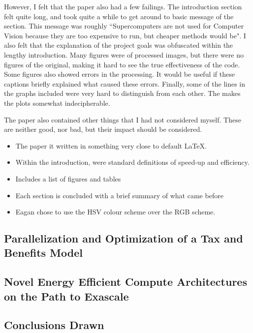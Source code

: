 \documentclass[../main.tex]{subfiles}
\begin{document}
    However, I felt that the paper also had a few failings.
    The introduction section felt quite long, and took quite a while to get around to basic message of the section.
    This message was roughly ``Supercomputers are not used for Computer Vision because they are too expensive to run, but cheaper methods would be".
    I also felt that the explanation of the project goals was obfuscated within the lengthy introduction.
    Many figures were of processed images, but there were no figures of the original, making it hard to see the true effectiveness of the code.
    Some figures also showed errors in the processing.
    It would be useful if these captions briefly explained what caused these errors.
    Finally, some of the lines in the graphs included were very hard to distinguish from each other.
    The makes the plots somewhat indecipherable.  

    The paper also contained other things that I had not considered myself.
    These are neither good, nor bad, but their impact should be considered.
    \begin{itemize}
      \item The paper it written in something very close to default \LaTeX.
      \item Within the introduction, were standard definitions of speed-up and efficiency.
      \item Includes a list of figures and tables
      \item Each section is concluded with a brief summary of what came before
      \item Eagan chose to use the HSV colour scheme over the RGB scheme.
    \end{itemize}
  \subsection{Parallelization and Optimization of a Tax and Benefits Model}
  \subsection{Novel Energy Efficient Compute Architectures on the Path to Exascale}
  \subsection{Conclusions Drawn}
\end{document}
